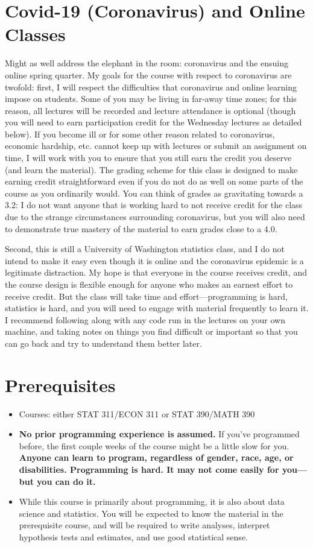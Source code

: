 \documentclass[12pt]{article}
\begin{document}
\section*{Covid-19 (Coronavirus) and Online Classes}

Might as well address the elephant in the room: coronavirus and the ensuing online spring quarter. My goals for the course with respect to coronavirus are twofold: first, I will respect the difficulties that coronavirus and online learning impose on students. Some of you may be living in far-away time zones; for this reason, all lectures will be recorded and lecture attendance is optional (though you will need to earn participation credit for the Wednesday lectures as detailed below). If you become ill or for some other reason related to coronavirus, economic hardship, etc. cannot keep up with lectures or submit an assignment on time, I will work with you to ensure that you still earn the credit you deserve (and learn the material). The grading scheme for this class is designed to make earning credit straightforward even if you do not do as well on some parts of the course as you ordinarily would. You can think of grades as gravitating towards a 3.2: I do not want anyone that is working hard to not receive credit for the class due to the strange circumstances surrounding coronavirus, but you will also need to demonstrate true mastery of the material to earn grades close to a 4.0.

Second, this is still a University of Washington statistics class, and I do not intend to make it easy even though it is online and the coronavirus epidemic is a legitimate distraction. My hope is that everyone in the course receives credit, and the course design is flexible enough for anyone who makes an earnest effort to receive credit. But the class will take time and effort---programming is hard, statistics is hard, and you will need to engage with material frequently to learn it. I recommend following along with any code run in the lectures on your own machine, and taking notes on things you find difficult or important so that you can go back and try to understand them better later.

\section*{Prerequisites}

\begin{itemize}
	\item Courses: either STAT 311/ECON 311 or STAT 390/MATH 390
	\item \textbf{No prior programming experience is assumed.} If you've programmed before, the first couple weeks of the course might be a little slow for you. \textbf{Anyone can learn to program, regardless of gender, race, age, or disabilities. Programming is hard. It may not come easily for you---but you can do it.}
	\item While this course is primarily about programming, it is also about data science and statistics. You will be expected to know the material in the prerequisite course, and will be required to write analyses, interpret hypothesis tests and estimates, and use good statistical sense.
\end{itemize}
\end{document}

